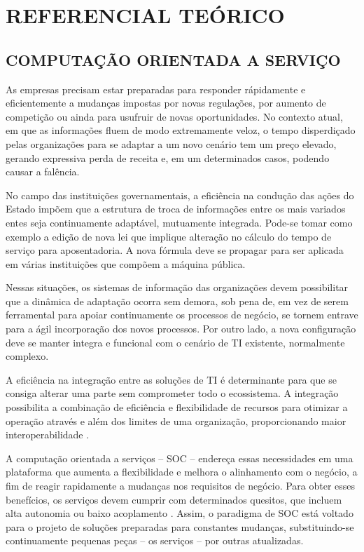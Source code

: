  
\chapter{REFERENCIAL TEÓRICO}
\vspace{-6mm}

\section{COMPUTAÇÃO ORIENTADA A SERVIÇO}
\vspace{-6mm}


As empresas precisam estar preparadas para responder rápidamente e
eficientemente a mudanças impostas por novas regulações, por aumento de
competição ou ainda para usufruir de novas oportunidades. No contexto atual, em que as
informações fluem de modo extremamente veloz, o tempo disperdiçado pelas organizações para se
adaptar a um novo cenário tem um preço elevado, gerando expressiva perda de
receita e, em um determinados casos, podendo causar a falência.

No campo das instituições governamentais, a eficiência na condução das ações do
Estado impõem que a estrutura de troca de informações entre os mais variados
entes seja continuamente adaptável, mutuamente integrada. Pode-se tomar como
exemplo a edição de nova lei que implique alteração no cálculo do tempo de
serviço para aposentadoria. A nova fórmula deve se propagar para ser
aplicada em várias instituições que compõem a máquina pública.

Nessas situações, os sistemas de informação das organizações devem possibilitar
que a dinâmica de adaptação ocorra sem demora, sob pena de, em vez de serem
ferramental para apoiar continuamente os processos de negócio, se tornem entrave
para a ágil incorporação dos novos processos. Por outro lado, a nova
configuração deve se manter integra e funcional com o cenário de TI existente,
normalmente complexo.

A eficiência na integração entre as soluções de TI é determinante para que se
consiga alterar uma parte sem comprometer todo o ecossistema. A integração
possibilita a combinação de eficiência e flexibilidade de recursos para otimizar
a operação através e além dos limites de uma organização, proporcionando maior
interoperabilidade \cite{papazoglou2008service}.

A computação orientada a serviços -- SOC -- endereça essas necessidades em uma
plataforma que aumenta a flexibilidade e melhora o alinhamento com o negócio, a
fim de reagir rapidamente a mudanças nos requisitos de negócio. Para obter esses
benefícios, os serviços devem cumprir com determinados quesitos, que incluem
alta autonomia ou baixo acoplamento \cite{erl2008soa}. Assim, o paradigma de SOC
está voltado para o projeto de soluções preparadas para constantes mudanças,
substituindo-se continuamente pequenas peças -- os serviços -- por outras
atualizadas.


